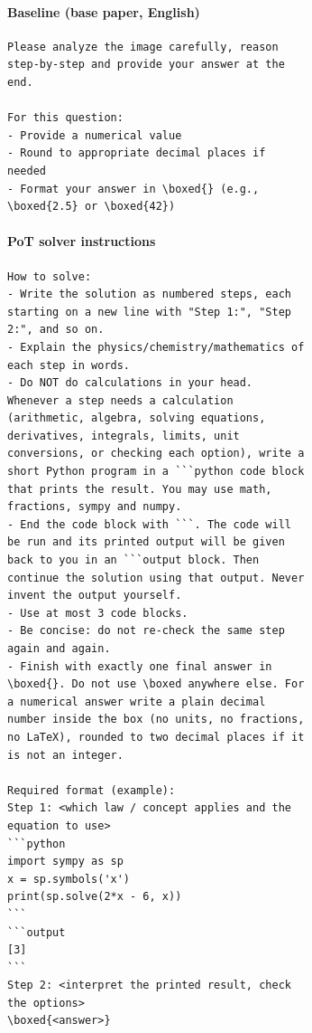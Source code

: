 \paragraph{Baseline (base paper, English)}
\begin{small}\begin{verbatim}
Please analyze the image carefully, reason
step-by-step and provide your answer at the
end.

For this question:
- Provide a numerical value
- Round to appropriate decimal places if
needed
- Format your answer in \boxed{} (e.g.,
\boxed{2.5} or \boxed{42})
\end{verbatim}\end{small}

\paragraph{PoT solver instructions}
\begin{small}\begin{verbatim}
How to solve:
- Write the solution as numbered steps, each
starting on a new line with "Step 1:", "Step
2:", and so on.
- Explain the physics/chemistry/mathematics of
each step in words.
- Do NOT do calculations in your head.
Whenever a step needs a calculation
(arithmetic, algebra, solving equations,
derivatives, integrals, limits, unit
conversions, or checking each option), write a
short Python program in a ```python code block
that prints the result. You may use math,
fractions, sympy and numpy.
- End the code block with ```. The code will
be run and its printed output will be given
back to you in an ```output block. Then
continue the solution using that output. Never
invent the output yourself.
- Use at most 3 code blocks.
- Be concise: do not re-check the same step
again and again.
- Finish with exactly one final answer in
\boxed{}. Do not use \boxed anywhere else. For
a numerical answer write a plain decimal
number inside the box (no units, no fractions,
no LaTeX), rounded to two decimal places if it
is not an integer.

Required format (example):
Step 1: <which law / concept applies and the
equation to use>
```python
import sympy as sp
x = sp.symbols('x')
print(sp.solve(2*x - 6, x))
```
```output
[3]
```
Step 2: <interpret the printed result, check
the options>
\boxed{<answer>}
\end{verbatim}\end{small}

